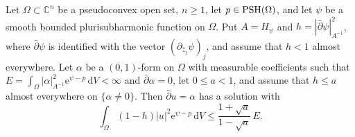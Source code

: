 \begin{lemma}\label{lem:bounded-weight-twist}
Let $\Omega\subset\mathbb C^n$ be a pseudoconvex open set, $n\ge1$, let $p\in\mathrm{PSH}(\Omega)$, and let $\psi$ be a smooth bounded plurisubharmonic function on $\Omega$. Put $A=H_\psi$ and $h=|\bar\partial\psi|_{A^{-1}}^2$, where $\bar\partial\psi$ is identified with the vector $(\partial_{\bar z_j}\psi)_j$, and assume that $h<1$ almost everywhere. Let $\alpha$ be a $(0,1)$-form on $\Omega$ with measurable coefficients such that $E=\int_\Omega|\alpha|_{A^{-1}}^2\mathrm e^{\psi-p}\,\mathrm dV<\infty$ and $\bar\partial\alpha=0$, let $0\le a<1$, and assume that $h\le a$ almost everywhere on $\{\alpha\ne0\}$. Then $\bar\partial u=\alpha$ has a solution with
\[
 \int_\Omega(1-h)|u|^2\mathrm e^{\psi-p}\,\mathrm dV
      \le\frac{1+\sqrt a}{1-\sqrt a}\,E.
\]
\end{lemma}
